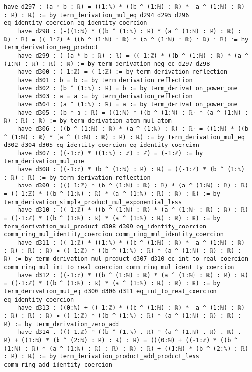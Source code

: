 \documentclass{article}
\begin{document}
\begin{tcolorbox}[colback=white!10, width=\linewidth]
\begin{lstlisting}[language=Lean4]
    have d297 : (a * b : ℝ) = ((1:ℕ) * ((b ^ (1:ℕ) : ℝ) * (a ^ (1:ℕ) : ℝ) : ℝ) : ℝ) := by term_derivation_mul_eq d294 d295 d296 eq_identity_coercion eq_identity_coercion
    have d298 : (-((1:ℕ) * ((b ^ (1:ℕ) : ℝ) * (a ^ (1:ℕ) : ℝ) : ℝ) : ℝ) : ℝ) = ((-1:ℤ) * ((b ^ (1:ℕ) : ℝ) * (a ^ (1:ℕ) : ℝ) : ℝ) : ℝ) := by term_derivation_neg_product
    have d299 : (-(a * b : ℝ) : ℝ) = ((-1:ℤ) * ((b ^ (1:ℕ) : ℝ) * (a ^ (1:ℕ) : ℝ) : ℝ) : ℝ) := by term_derivation_neg_eq d297 d298
    have d300 : (-1:ℤ) = (-1:ℤ) := by term_derivation_reflection
    have d301 : b = b := by term_derivation_reflection
    have d302 : (b ^ (1:ℕ) : ℝ) = b := by term_derivation_power_one
    have d303 : a = a := by term_derivation_reflection
    have d304 : (a ^ (1:ℕ) : ℝ) = a := by term_derivation_power_one
    have d305 : (b * a : ℝ) = ((1:ℕ) * ((b ^ (1:ℕ) : ℝ) * (a ^ (1:ℕ) : ℝ) : ℝ) : ℝ) := by term_derivation_atom_mul_atom
    have d306 : ((b ^ (1:ℕ) : ℝ) * (a ^ (1:ℕ) : ℝ) : ℝ) = ((1:ℕ) * ((b ^ (1:ℕ) : ℝ) * (a ^ (1:ℕ) : ℝ) : ℝ) : ℝ) := by term_derivation_mul_eq d302 d304 d305 eq_identity_coercion eq_identity_coercion
    have d307 : ((-1:ℤ) * ((1:ℕ) : ℤ) : ℤ) = (-1:ℤ) := by term_derivation_mul_one
    have d308 : ((-1:ℤ) * (b ^ (1:ℕ) : ℝ) : ℝ) = ((-1:ℤ) * (b ^ (1:ℕ) : ℝ) : ℝ) := by term_derivation_reflection
    have d309 : (((-1:ℤ) * (b ^ (1:ℕ) : ℝ) : ℝ) * (a ^ (1:ℕ) : ℝ) : ℝ) = ((-1:ℤ) * ((b ^ (1:ℕ) : ℝ) * (a ^ (1:ℕ) : ℝ) : ℝ) : ℝ) := by term_derivation_simple_product_mul_exponential_less
    have d310 : ((-1:ℤ) * ((b ^ (1:ℕ) : ℝ) * (a ^ (1:ℕ) : ℝ) : ℝ) : ℝ) = ((-1:ℤ) * ((b ^ (1:ℕ) : ℝ) * (a ^ (1:ℕ) : ℝ) : ℝ) : ℝ) := by term_derivation_mul_product d308 d309 eq_identity_coercion comm_ring_mul_identity_coercion comm_ring_mul_identity_coercion
    have d311 : ((-1:ℤ) * ((1:ℕ) * ((b ^ (1:ℕ) : ℝ) * (a ^ (1:ℕ) : ℝ) : ℝ) : ℝ) : ℝ) = ((-1:ℤ) * ((b ^ (1:ℕ) : ℝ) * (a ^ (1:ℕ) : ℝ) : ℝ) : ℝ) := by term_derivation_mul_product d307 d310 eq_int_to_real_coercion comm_ring_mul_int_to_real_coercion comm_ring_mul_identity_coercion
    have d312 : ((-1:ℤ) * ((b ^ (1:ℕ) : ℝ) * (a ^ (1:ℕ) : ℝ) : ℝ) : ℝ) = ((-1:ℤ) * ((b ^ (1:ℕ) : ℝ) * (a ^ (1:ℕ) : ℝ) : ℝ) : ℝ) := by term_derivation_mul_eq d300 d306 d311 eq_int_to_real_coercion eq_identity_coercion
    have d313 : ((0:ℕ) + ((-1:ℤ) * ((b ^ (1:ℕ) : ℝ) * (a ^ (1:ℕ) : ℝ) : ℝ) : ℝ) : ℝ) = ((-1:ℤ) * ((b ^ (1:ℕ) : ℝ) * (a ^ (1:ℕ) : ℝ) : ℝ) : ℝ) := by term_derivation_zero_add
    have d314 : (((-1:ℤ) * ((b ^ (1:ℕ) : ℝ) * (a ^ (1:ℕ) : ℝ) : ℝ) : ℝ) + ((1:ℕ) * (b ^ (2:ℕ) : ℝ) : ℝ) : ℝ) = (((0:ℕ) + ((-1:ℤ) * ((b ^ (1:ℕ) : ℝ) * (a ^ (1:ℕ) : ℝ) : ℝ) : ℝ) : ℝ) + ((1:ℕ) * (b ^ (2:ℕ) : ℝ) : ℝ) : ℝ) := by term_derivation_product_add_product_less comm_ring_add_identity_coercion

\end{lstlisting}
\end{tcolorbox}
\end{document}

